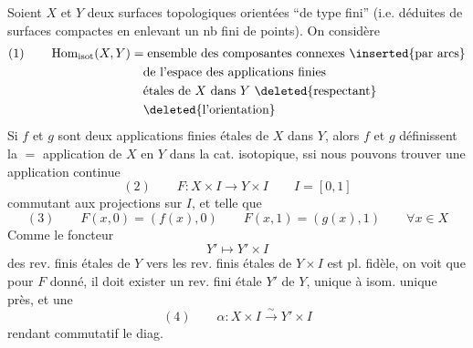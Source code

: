 Soient $X$ et $Y$ deux surfaces topologiques orientées  ``de type fini'' (i.e. déduites de surfaces compactes en enlevant un nb fini de points). On considère
\[
\begin{aligned}
(1)\qquad \operatorname{Hom}_{\mathrm{isot}}(X,Y)
&=\text{ensemble des composantes connexes \inserted{par arcs}}\\
&\quad\text{de l'espace des applications finies}\\
&\quad\text{étales de $X$ dans $Y$ \deleted{respectant}}\\
&\quad\deleted{\text{l'orientation}}
\end{aligned}
\]
Si $f$ et $g$ sont deux applications finies étales de $X$ dans $Y$, alors $f$ et $g$  définissent la $=$  application de $X$ en $Y$ dans la cat. isotopique, ssi nous pouvons trouver une application continue 
\[
(2)\qquad F:X\times I\longrightarrow Y\times I\qquad I=[0,1]
\]
commutant aux projections sur $I$, et telle que
\[
(3)\qquad F(x,0)=(f(x),0)\qquad F(x,1)=(g(x),1)\qquad\forall x\in X
\]
Comme le foncteur
\[
Y'\longmapsto Y'\times I
\]
des rev. finis étales de $Y$ vers les rev. finis étales de $Y\times I$ est pl. fidèle, on voit que  pour $F$ donné, il doit exister un rev. fini étale $Y'$ de $Y$, unique à isom. unique près, et une 
\[
(4)\qquad \alpha:X\times I\xrightarrow{\sim}Y'\times I
\]
rendant commutatif le diag. 
